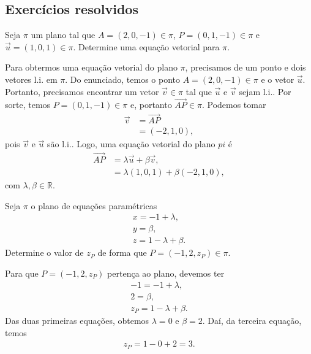 \subsection{Exercícios resolvidos}

\begin{exeresol}
  Seja $\pi$ um plano tal que $A=(2,0,-1)\in\pi$, $P=(0,1,-1)\in\pi$ e $\vec{u}=(1,0,1)\in\pi$. Determine uma equação vetorial para $\pi$.
\end{exeresol}
\begin{resol}
  Para obtermos uma equação vetorial do plano $\pi$, precisamos de um ponto e dois vetores l.i. em $\pi$. Do enunciado, temos o ponto $A=(2,0,-1)\in\pi$ e o vetor $\vec{u}$. Portanto, precisamos encontrar um vetor $\vec{v}\in\pi$ tal que $\vec{u}$ e $\vec{v}$ sejam l.i.. Por sorte, temos $P=(0,1,-1)\in\pi$ e, portanto $\overrightarrow{AP}\in\pi$. Podemos tomar
  \begin{align}
    \vec{v} &= \overrightarrow{AP}\\
            &= (-2,1,0),
  \end{align}
  pois $\vec{v}$ e $\vec{u}$ são l.i.. Logo, uma equação vetorial do plano $pi$ é
  \begin{align}
    \overrightarrow{AP} &= \lambda\vec{u}+\beta\vec{v},\\
                        &= \lambda (1,0,1) + \beta (-2,1,0),
  \end{align}
  com $\lambda,\beta\in\mathbb{R}$.
\end{resol}

\begin{exeresol}
  Seja $\pi$ o plano de equações paramétricas
  \begin{align}
    x = -1 + \lambda,\\
    y = \beta,\\
    z = 1 - \lambda + \beta.
  \end{align}
  Determine o valor de $z_P$ de forma que $P=(-1,2,z_P)\in\pi$.
\end{exeresol}
\begin{resol}
  Para que $P=(-1,2,z_P)$ pertença ao plano, devemos ter
  \begin{align}
    -1 = -1 + \lambda,\\
    2 = \beta,\\
    z_P = 1 - \lambda + \beta.
  \end{align}
  Das duas primeiras equações, obtemos $\lambda=0$ e $\beta=2$. Daí, da terceira equação, temos
  \begin{align}
    z_P = 1 - 0 + 2 = 3.
  \end{align}
\end{resol}

\emconstrucao
